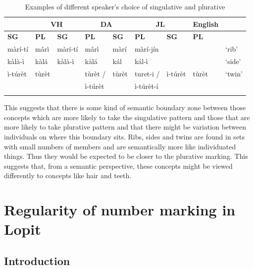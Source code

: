 \documentclass[output=paper]{langsci/langscibook}
\begin{document}
\begin{table}
\begin{tabularx}{\textwidth}{lllllllll}
\lsptoprule

\multicolumn{2}{c}{ \textbf{AL}} & \multicolumn{2}{c}{ \textbf{VH}} & \multicolumn{2}{c}{ \textbf{DA}} & \multicolumn{2}{c}{ \textbf{JL}} & \textbf{English}\\ \midrule
\textbf{SG} & \textbf{PL} & \textbf{SG} & \textbf{PL} & \textbf{SG} & \textbf{PL} & \textbf{SG} & 
 \textbf{PL} & \\ \midrule
 m\`{a}r\'{i}-t\'{i} &  m\^{a}r\`{i} &  m\`{a}r\'{i}-t\'{i} &  m\^{a}r\`{i} &  m\`{a}r\'{i} &  m\`{a}r\'{i}-j\'{i}n &  &  & ‘rib’\\
 k\`{a}l\`{a}-\`{i} &  k\`{a}l\'{a} &  k\`{a}l\`{a}-\`{i} &  k\`{a}l\'{a} &  k\'{a}l &  k\'{a}l-\`{i} &  &  & ‘side’\\
 \`{i}-t\'{u}r\`{e}t &  t\`{u}r\`{e}t &  &  t\`{u}r\`{e}t / & {t\`{u}r\`{e}t } & {turet-i /}

&  \`{i}-t\'{u}r\`{e}t &  t\`{u}r\`{e}t & ‘twin’\\
&&&  \`{i}-t\'{u}r\`{e}t &&  \`{i}-t\'{u}r\`{e}t-\'{i} & & \\
\lspbottomrule
\end{tabularx}
\caption{Examples of different speaker’s choice of singulative and plurative}
\label{tab:moodie:8}
\end{table}

This suggests that there is some kind of semantic boundary zone between those concepts which are more likely to take the singulative pattern and those that are more likely to take plurative pattern and that there might be variation between individuals on where this boundary sits. Ribs, sides and twins are found in sets with small numbers of members and are semantically more like individuated things. Thus they would be expected to be closer to the plurative marking. This suggests that, from a semantic perspective, these concepts might be viewed differently to concepts like hair and teeth.

\section{Regularity of number marking in Lopit}\label{sec:moodie:4}


\subsection{Introduction} \label{sec:moodie:4.1}
\end{document}
